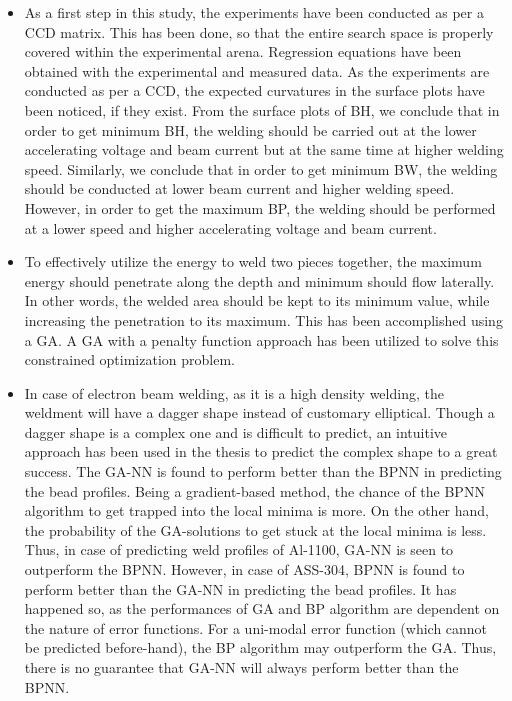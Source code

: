 \begin{itemize}

\item As a first step in this study, the experiments have been 
conducted 
as per a CCD matrix. This has been done, so that the entire search 
space is properly covered within the experimental arena. Regression 
equations have been obtained with the experimental and measured data. 
As the experiments are conducted as per a CCD, the expected curvatures 
in the surface plots have been noticed, if they exist. From the surface 
plots of BH,  we conclude that in order to get minimum BH, the welding 
should be carried out at the lower accelerating voltage and beam current 
but at the same time at higher welding speed. Similarly, we conclude 
that in order to get minimum BW, the welding should be conducted at 
lower beam current and higher welding speed. However, in order to get 
the maximum BP, the welding should be performed at a lower speed and 
higher accelerating voltage and beam current.

\item To effectively utilize the energy to weld two pieces together, the  maximum energy should penetrate along the depth and minimum should flow laterally. In other words, the welded area should be kept to its minimum value, while increasing the penetration to its maximum. This has been accomplished using a GA. A GA with a penalty function approach has been utilized to solve this constrained optimization problem.


\item In case of electron beam welding, as it is a high density welding, 
the weldment will have a  dagger shape instead of customary 
elliptical. Though a dagger shape is a complex one and is difficult to 
predict, an intuitive approach has been used in the thesis to 
predict the complex shape to a great success. The GA-NN is found to 
perform better than the BPNN in predicting the bead profiles. Being  a 
gradient-based method, the chance of the BPNN algorithm to get trapped 
into the local minima is more. On the other hand, the probability of the 
GA-solutions to get stuck at the local minima is less. Thus, in case of 
predicting  weld profiles of Al-1100, GA-NN is seen to outperform the 
BPNN. However, in case of ASS-304, BPNN is found to perform better than 
the GA-NN in predicting the bead profiles. It has happened so, as the 
performances of GA and BP algorithm are dependent on the nature of error 
functions. For a uni-modal error function (which cannot be predicted 
before-hand), the BP algorithm may outperform the GA. Thus, there is no 
guarantee that GA-NN will always perform better than the BPNN.







\end{itemize}
